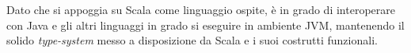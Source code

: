 Dato che si appoggia su Scala come linguaggio ospite, è in grado di interoperare con Java e gli altri linguaggi in grado si eseguire in ambiente JVM, mantenendo il solido \emph{type-system} messo a disposizione da Scala e i suoi costrutti funzionali.

